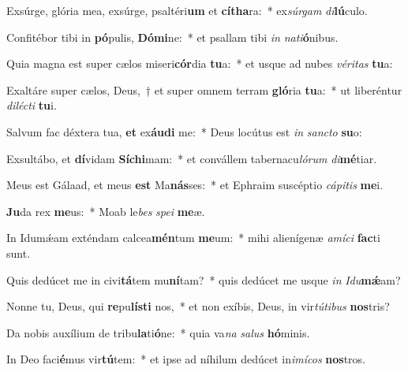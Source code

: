 \item Exsúrge, glória mea, exsúrge, psaltéri\textbf{um} et \textbf{cí}\textbf{tha}ra:~* ex\textit{súr}\textit{gam} \textit{di}\textbf{lú}culo.
\item Confitébor tibi in \textbf{pó}pulis, \textbf{Dó}\textbf{mi}ne:~* et psallam tibi \textit{in} \textit{na}\textit{ti}\textbf{ó}nibus.
\item Quia magna est super cælos miseri\textbf{cór}dia \textbf{tu}a:~* et usque ad nubes \textit{vé}\textit{ri}\textit{tas} \textbf{tu}a:
\item Exaltáre super cælos, Deus,~† et super omnem terram \textbf{gló}ria \textbf{tu}a:~* ut liberéntur \textit{di}\textit{léc}\textit{ti} \textbf{tu}i.
\item Salvum fac déxtera tua, \textbf{et} ex\textbf{áu}\textbf{di} me:~* Deus locútus est \textit{in} \textit{sanc}\textit{to} \textbf{su}o:
\item Exsultábo, et \textbf{dí}vidam \textbf{Sí}\textbf{chi}mam:~* et convállem tabernacu\textit{ló}\textit{rum} \textit{di}\textbf{mé}tiar.
\item Meus est Gálaad, et meus \textbf{est} Ma\textbf{nás}ses:~* et Ephraim suscéptio \textit{cá}\textit{pi}\textit{tis} \textbf{me}i.
\item \textbf{Ju}da rex \textbf{me}us:~* Moab le\textit{bes} \textit{spe}\textit{i} \textbf{me}æ.
\item In Idumǽam exténdam calcea\textbf{mén}tum \textbf{me}um:~* mihi alienígenæ \textit{a}\textit{mí}\textit{ci} \textbf{fac}ti sunt.
\item Quis dedúcet me in civi\textbf{tá}tem mu\textbf{ní}tam?~* quis dedúcet me usque \textit{in} \textit{I}\textit{du}\textbf{mǽ}am?
\item Nonne tu, Deus, qui \textbf{re}pu\textbf{lís}\textbf{ti} nos,~* et non exíbis, Deus, in vir\textit{tú}\textit{ti}\textit{bus} \textbf{nos}tris?
\item Da nobis auxílium de tribu\textbf{la}ti\textbf{ó}ne:~* quia va\textit{na} \textit{sa}\textit{lus} \textbf{hó}minis.
\item In Deo faci\textbf{é}mus vir\textbf{tú}tem:~* et ipse ad níhilum dedúcet in\textit{i}\textit{mí}\textit{cos} \textbf{nos}tros.
